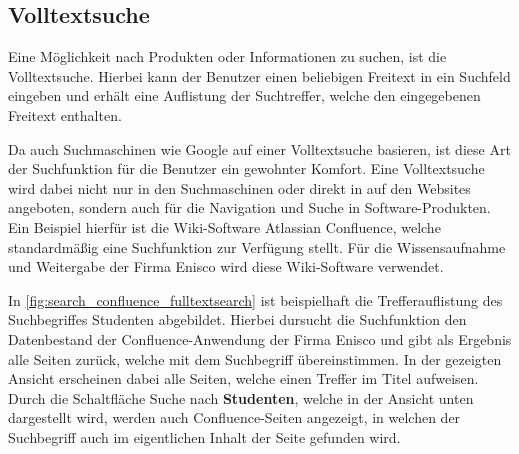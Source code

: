 


\subsection{Volltextsuche\label{subsec2.1.2:Unterunterpunkt-2}}

Eine Möglichkeit nach Produkten oder Informationen zu suchen, ist die Volltextsuche. Hierbei kann der Benutzer einen beliebigen Freitext in ein Suchfeld eingeben und erhält eine Auflistung der Suchtreffer, welche den eingegebenen Freitext enthalten.

Da auch Suchmaschinen wie Google auf einer Volltextsuche basieren, ist diese Art der Suchfunktion für die Benutzer ein gewohnter Komfort. Eine Volltextsuche wird dabei nicht nur in den Suchmaschinen oder direkt in auf den Websites angeboten, sondern auch für die Navigation und Suche in Software-Produkten. Ein Beispiel hierfür ist die Wiki-Software \glqq Atlassian Confluence\grqq{}, welche standardmäßig eine Suchfunktion zur Verfügung stellt. Für die Wissensaufnahme und Weitergabe der Firma Enisco wird diese Wiki-Software verwendet.

In \autoref{fig:search_confluence_fulltextsearch} ist beispielhaft die Trefferauflistung des Suchbegriffes \glqq Studenten\grqq{} abgebildet. Hierbei dursucht die Suchfunktion den Datenbestand der Confluence-Anwendung der Firma Enisco und gibt als Ergebnis alle Seiten zurück, welche mit dem Suchbegriff übereinstimmen. In der gezeigten Ansicht erscheinen dabei alle Seiten, welche einen Treffer im Titel aufweisen. Durch die Schaltfläche \glqq Suche nach \textbf{Studenten}\grqq{}, welche in der Ansicht unten dargestellt wird, werden auch Confluence-Seiten angezeigt, in welchen der Suchbegriff auch im eigentlichen Inhalt der Seite gefunden wird.

